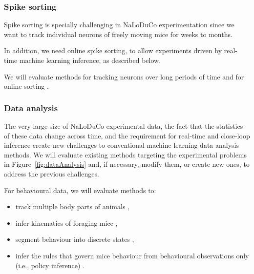 \subsubsection{Spike sorting}

Spike sorting is specially challenging in NaLoDuCo experimentation since we
want to track individual neurons of freely moving mice for weeks to months.

In addition, we need online spike sorting, to allow experiments driven
by real-time machine learning inference, as described below.

We will evaluate methods for tracking neurons over long periods of time
\citep[e.g.,][]{yuanEtAl24,vanBeestEtAl24} and for online sorting
\citep[e.g.,][]{rutishauserEtAl06,santhanamEtAl04}.

\subsubsection{Data analysis}

The very large size of NaLoDuCo experimental data, the fact that the statistics
of these data change across time, and the requirement for real-time and
close-loop inference create new challenges to conventional machine learning
data analysis methods.
%
We will evaluate existing methods targeting the experimental problems
in Figure~\ref{fig:dataAnalysis} and, if necessary, modify them, or create new
ones, to address the previous challenges.

For behavioural data, we will evaluate methods to:

\begin{itemize}

    \item track multiple body parts of
animals \citep[e.g.,][and a switching-linear-dynamical method using RFIDs that
we will develop]{mathisEtAl18,pereiraEtAl22,bidermanEtAl24},

    \item infer kinematics of foraging mice \citep[e.g.,][]{ldspython,challaEtAl11},

    \item segment behaviour into discrete states \citep[e.g.,][and a hierarchical HMM
that we will develop]{wiltschkoEtAl15,hsuAndYttri21},

    \item infer the rules that govern mice behaviour from behavioural observations
only (i.e., policy inference) \citep[e.g.,][]{ziebartEtAl08,zhuEtAl23}.

\end{itemize}

